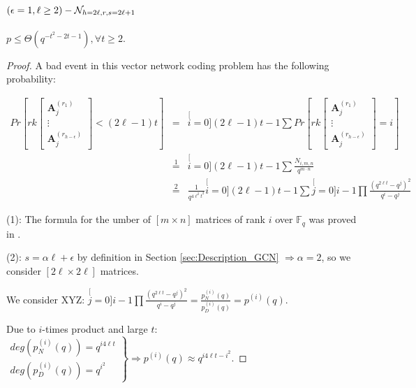 \section{$\left(\epsilon=1,\ell\protect\geq2\right)-\mathcal{N}_{h=2\ell,r,s=2\ell+1}$}
\begin{lem}
$p\leq\Theta\left(q^{-t^{2}-2t-1}\right),\forall t\geq2$. \label{lem:p_e1l2}
\end{lem}
\begin{proof}
A bad event in this vector network coding problem has the following
probability:

\begin{eqnarray*}
Pr\left[rk\left[\begin{array}{c}
\boldsymbol{A}_{j}^{\left(r_{1}\right)}\\
\vdots\\
\boldsymbol{A}_{j}^{\left(r_{h-\epsilon}\right)}
\end{array}\right]<\left(2\ell-1\right)t\right] & = & \stackrel[i=0]{\left(2\ell-1\right)t-1}{\mathop{\sum}}Pr\left[rk\left[\begin{array}{c}
\boldsymbol{A}_{j}^{\left(r_{1}\right)}\\
\vdots\\
\boldsymbol{A}_{j}^{\left(r_{h-\epsilon}\right)}
\end{array}\right]=i\right]\\
 & \overset{1}{=} & \stackrel[i=0]{\left(2\ell-1\right)t-1}{\mathop{\sum}}\frac{N_{i,m,n}}{q^{m\cdot n}}\\
 & \overset{2}{=} & \frac{1}{q^{4\ell^{2}t^{2}}}\stackrel[i=0]{\left(2\ell-1\right)t-1}{\mathop{\sum}}\stackrel[j=0]{i-1}{\mathop{\prod}}\frac{\left(q^{2\ell t}-q^{j}\right)^{2}}{q^{i}-q^{j}}
\end{eqnarray*}

(1): The formula for the umber of $\left[m\times n\right]$ matrices
of rank $i$ over $\ensuremath{\mathbb{F}}_{q}$ was proved in \cite{Overbeck:2007}.

(2): $s=\alpha\ell+\epsilon$ by definition in Section \ref{sec:Description_GCN}
$\Rightarrow\alpha=2$, so we consider $\left[2\ell\times2\ell\right]$
matrices.

We consider XYZ: $\stackrel[j=0]{i-1}{\mathop{\prod}}\frac{\left(q^{2\ell t}-q^{j}\right)^{2}}{q^{i}-q^{j}}=\frac{p_{N}^{(i)}(q)}{p_{D}^{(i)}(q)}=p^{(i)}(q)$.

Due to $i$-times product and large $t$: $\left.\begin{array}{c}
deg\left(p_{N}^{(i)}(q)\right)=q^{i4\ell t}\\
deg\left(p_{D}^{(i)}(q)\right)=q^{i^{2}}
\end{array}\right\} \Rightarrow p^{(i)}(q)\approx q^{i4\ell t-i^{2}}$.


\end{proof}
